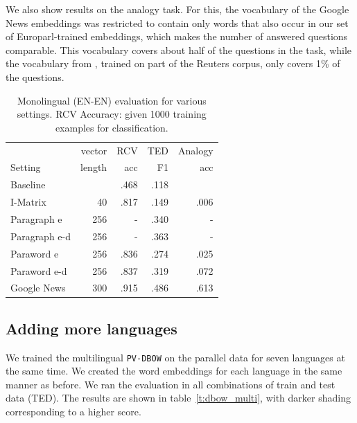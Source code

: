 We also show results on the analogy task. For this, the vocabulary of the Google News embeddings was restricted to contain only words that also occur in our set of Europarl-trained embeddings, which makes the number of answered questions comparable. This vocabulary covers about half of the questions in the task, while the vocabulary from \cite{klementiev2012inducing}, trained on part of the Reuters corpus, only covers 1\% of the questions.

\begin{table}[ht]
\center
\setlength\tabcolsep{3pt}
\begin{tabular}{l |rr r r}
 			&vector	&RCV 			&TED		&Analogy\\
Setting		&length	&acc			&F1		&acc\\\hline
Baseline		&		&.468			&.118	 	&		\\
I-Matrix		&40		&.817			&.149		&.006\\
Paragraph e		&256		&- 			&.340		&-\\
Paragraph e-d 	&256		&- 			&.363		&-\\
Paraword e		&256		&.836			&.274		&.025	\\
Paraword e-d	&256		&.837			&.319		&.072\\
Google News		&300		&.915			&.486		&.613\\
\end{tabular}
\caption{Monolingual (EN-EN) evaluation for various settings.
RCV Accuracy: given 1000 training examples for classification.}
\label{t:monoEval}
\end{table}

\subsection{Adding more languages}
We trained the multilingual {\tt PV-DBOW} on the parallel data for seven languages at the same time. We created the word embeddings for each language in the same manner as before. We ran the evaluation in all combinations of train and test data (TED). The results are shown in table~\ref{t:dbow_multi}, with darker shading corresponding to a higher score. 

